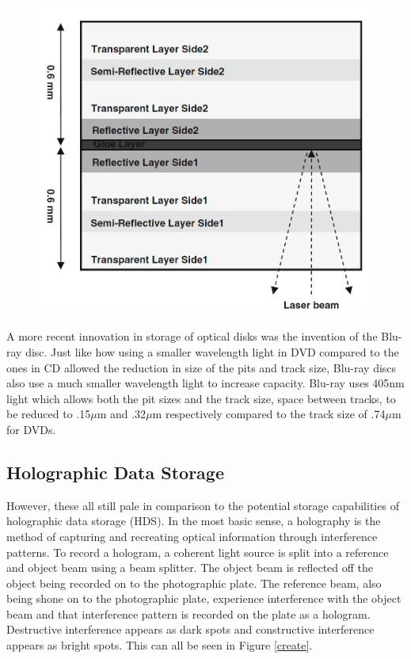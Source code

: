 \documentclass[ aip, 12pt]{revtex4-1} %
\begin{document}
\begin{figure}[H]
\centerline{\includegraphics[scale=.45]{DVD.png}}
\caption{ }
\label{DVD}
\end{figure} 

A more recent innovation in storage of optical disks was the invention of the Blu-ray disc. Just like how using a smaller wavelength light in DVD compared to the ones in CD allowed the reduction in size of the pits and track size, Blu-ray discs also use a much smaller wavelength light to increase capacity. Blu-ray uses 405nm light which allows both the pit sizes and the track size, space between tracks, to be reduced to .15$\mu$m and .32$\mu$m respectively compared to the track size of .74$\mu$m for DVDs.


\subsection{Holographic Data Storage}
However, these all still pale in comparison to the potential storage capabilities of holographic data storage (HDS). In the most basic sense, a holography is the method of capturing and recreating optical information through interference patterns. To record a hologram, a coherent light source is split into a reference and object beam using a beam splitter. The object beam is reflected off the object being recorded on to the photographic plate. The reference beam, also being shone on to the photographic plate, experience interference with the object beam and that interference pattern is recorded on the plate as a hologram. Destructive interference appears as dark spots and constructive interference appears as bright spots. This can all be seen in Figure \ref{create}. 
\end{document}
